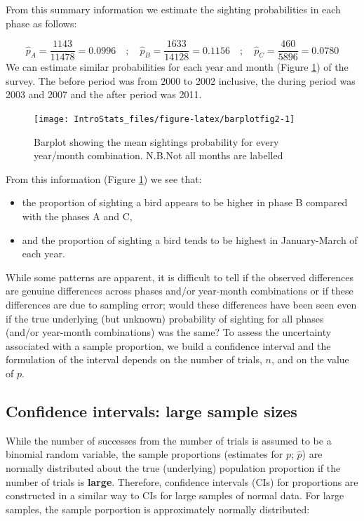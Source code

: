 \documentclass[
  oneside]{krantz}
\providecommand{\tightlist}{%
  \setlength{\itemsep}{0pt}\setlength{\parskip}{0pt}}
\begin{document}
From this summary information we estimate the sighting probabilities in each phase as follows:

\[\hat p_{A} = \frac{1143}{11478} = 0.0996 \quad; \quad \hat p_{B} = \frac{1633}{14128} = 0.1156 \quad ; \quad \hat p_{C} = \frac{460}{5896} = 0.0780\]
We can estimate similar probabilities for each year and month (Figure \ref{fig:barplotfig2}) of the survey. The before period was from 2000 to 2002 inclusive, the during period was 2003 and 2007 and the after period was 2011.

\begin{figure}

{\centering \texttt{[image: IntroStats\_files/figure-latex/barplotfig2-1]} 

}

\caption{Barplot showing the mean sightings probability for every year/month combination. N.B.Not all months are labelled}\label{fig:barplotfig2}
\end{figure}

From this information (Figure \ref{fig:barplotfig2}) we see that:

\begin{itemize}
\tightlist
\item
  the proportion of sighting a bird appears to be higher in phase B compared with the phases A and C,
\item
  and the proportion of sighting a bird tends to be highest in January-March of each year.
\end{itemize}

While some patterns are apparent, it is difficult to tell if the observed differences are genuine differences across phases and/or year-month combinations or if these differences are due to sampling error; would these differences have been seen even if the true underlying (but unknown) probability of sighting for all phases (and/or year-month combinations) was the same? To assess the uncertainty associated with a sample proportion, we build a confidence interval and the formulation of the interval depends on the number of trials, \(n\), and on the value of \(p\).

\hypertarget{confidence-intervals-large-sample-sizes}{%
\subsection{Confidence intervals: large sample sizes}\label{confidence-intervals-large-sample-sizes}}

While the number of successes from the number of trials is assumed to be a binomial random variable, the sample proportions (estimates for \(p\); \(\hat{p}\)) are normally distributed about the true (underlying) population proportion if the number of trials is \textbf{large}. Therefore, confidence intervals (CIs) for proportions are constructed in a similar way to CIs for large samples of normal data. For large samples, the sample porportion is approximately normally distributed:
\end{document}
